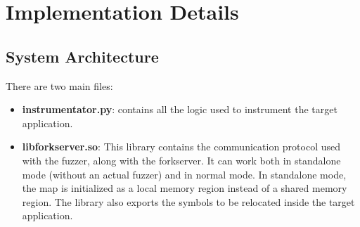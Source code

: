\documentclass{report}
\begin{document}
        \chapter{Implementation Details}
            \section{System Architecture}
                There are two main files:
                \begin{itemize}
                    \item \textbf{instrumentator.py}: contains all the logic used to instrument the target application.\\
                    \item \textbf{libforkserver.so}: This library contains the communication protocol used with the fuzzer, along with the forkserver.
                        It can work both in standalone mode (without an actual fuzzer) and in normal mode.
                        In standalone mode, the map is initialized as a local memory region instead of a shared memory region.
                        The library also exports the symbols to be relocated inside the target application.\\
                \end{itemize}       
\end{document}
